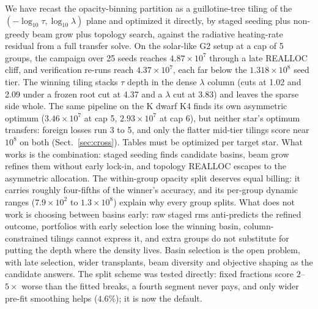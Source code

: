 \documentclass{aa}
\begin{document}
   We have recast the opacity-binning partition as a guillotine-tree
   tiling of the $(-\log_{10}\tau,\log_{10}\lambda)$ plane and optimized
   it directly, by staged seeding plus non-greedy beam grow plus topology
   search, against the radiative heating-rate residual from a full
   transfer solve. On the solar-like G2 setup at a cap of 5 groups, the
   campaign over 25 seeds reaches $4.87\times10^{7}$ through a late
   REALLOC cliff, and verification re-runs reach $4.37\times10^{7}$,
   each far below the $1.318\times10^{8}$ seed tier. The winning tiling
   stacks $\tau$ depth in the dense $\lambda$ column (cuts at 1.02 and
   2.09 under a frozen root cut at 4.37 and a $\lambda$ cut at 3.83) and
   leaves the sparse side whole. The same pipeline on the K dwarf K4
   finds its own asymmetric optimum ($3.46\times10^{7}$ at cap 5,
   $2.93\times10^{7}$ at cap 6), but neither star's optimum transfers:
   foreign losses run 3 to 5, and only the flatter mid-tier tilings
   score near $10^{8}$ on both (Sect.~\ref{sec:cross}). Tables must be
   optimized per target star.
   What works is the combination: staged seeding finds candidate basins,
   beam grow refines them without early lock-in, and topology REALLOC
   escapes to the asymmetric allocation. The within-group opacity split
   deserves equal billing: it carries roughly four-fifths of the
   winner's accuracy, and its per-group dynamic ranges ($7.9\times10^{2}$
   to $1.3\times10^{8}$) explain why every group splits. What does not
   work is choosing between basins early: raw staged rms anti-predicts
   the refined outcome, portfolios with early selection lose the winning
   basin, column-constrained tilings cannot express it, and extra groups
   do not substitute for putting the depth where the density lives.
   Basin selection is the open problem, with late selection, wider
   transplants, beam diversity and objective shaping as the candidate
   answers. The split scheme was tested directly: fixed fractions score
   $2$--$5\times$ worse than the fitted breaks, a fourth segment never
   pays, and only wider pre-fit smoothing helps ($4.6\%$); it is now the
   default.
\end{document}
